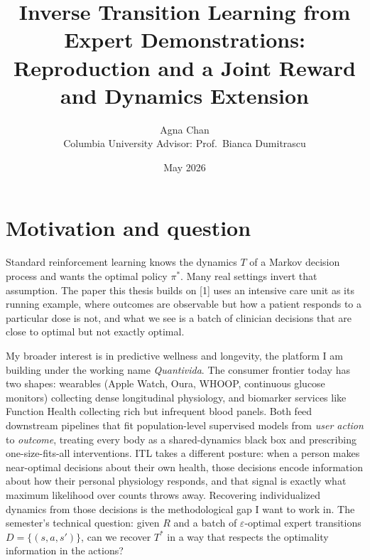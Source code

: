 \documentclass[11pt]{article}
\title{\vspace{-2em}Inverse Transition Learning from Expert Demonstrations:\\
\large Reproduction and a Joint Reward and Dynamics Extension}
\author{Agna Chan \\ \small Columbia University \quad Advisor: Prof.\ Bianca Dumitrascu}
\date{\small May 2026}
\begin{document}
\maketitle
\vspace{-2em}

\section{Motivation and question}

Standard reinforcement learning knows the dynamics $T$ of a Markov decision process and wants the optimal policy $\pi^{*}$. Many real settings invert that assumption. The paper this thesis builds on [1] uses an intensive care unit as its running example, where outcomes are observable but how a patient responds to a particular dose is not, and what we see is a batch of clinician decisions that are close to optimal but not exactly optimal.

My broader interest is in predictive wellness and longevity, the platform I am building under the working name \emph{Quantivida}. The consumer frontier today has two shapes: wearables (Apple Watch, Oura, WHOOP, continuous glucose monitors) collecting dense longitudinal physiology, and biomarker services like Function Health collecting rich but infrequent blood panels. Both feed downstream pipelines that fit population-level supervised models from \emph{user action} to \emph{outcome}, treating every body as a shared-dynamics black box and prescribing one-size-fits-all interventions. ITL takes a different posture: when a person makes near-optimal decisions about their own health, those decisions encode information about how their personal physiology responds, and that signal is exactly what maximum likelihood over counts throws away. Recovering individualized dynamics from those decisions is the methodological gap I want to work in. The semester's technical question: given $R$ and a batch of $\varepsilon$-optimal expert transitions $D = \{(s, a, s')\}$, can we recover $T^{*}$ in a way that respects the optimality information in the actions?
\end{document}
